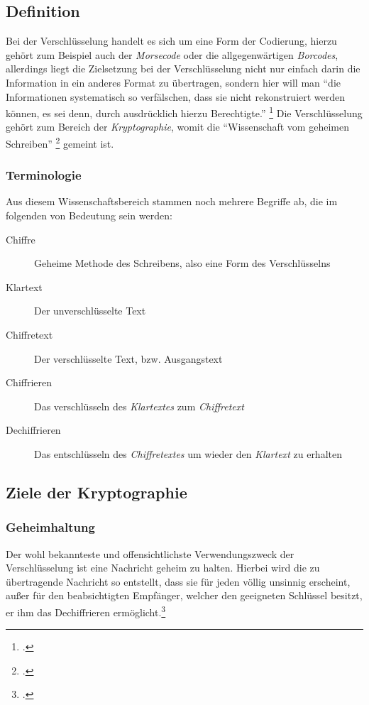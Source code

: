\documentclass{scrarticle}
\begin{document}
    \subsection{Definition}
    Bei der Verschlüsselung handelt es sich um eine Form der Codierung, hierzu gehört zum Beispiel auch der \emph{Morsecode} oder die allgegenwärtigen \emph{Borcodes}, allerdings liegt die Zielsetzung bei der Verschlüsselung nicht nur einfach darin die Information in ein anderes Format zu übertragen, sondern hier will man \enquote{die Informationen systematisch so verfälschen, dass sie nicht rekonstruiert werden können, es sei denn, durch ausdrücklich hierzu Berechtigte.} \footcite[263]{dankmeier2006}
    Die Verschlüsselung gehört zum Bereich der \emph{Kryptographie}, womit die \enquote{Wissenschaft vom geheimen Schreiben} \footcite[1]{watjen2008} gemeint ist.

    \subsubsection{Terminologie}
    Aus diesem Wissenschaftsbereich stammen noch mehrere Begriffe ab, die im folgenden von Bedeutung sein werden:
    \begin{description}
        \item[Chiffre] Geheime Methode des Schreibens, also eine Form des Verschlüsselns
        \item[Klartext] Der unverschlüsselte Text
        \item[Chiffretext] Der verschlüsselte Text, bzw. Ausgangstext
        \item[Chiffrieren] Das verschlüsseln des \emph{Klartextes} zum \emph{Chiffretext}
        \item[Dechiffrieren] Das entschlüsseln des \emph{Chiffretextes} um wieder den \emph{Klartext} zu erhalten
    \end{description}

    \subsection[Ziele]{Ziele der Kryptographie}
    \subsubsection{Geheimhaltung}
    Der wohl bekannteste und offensichtlichste Verwendungszweck der Verschlüsselung ist eine Nachricht geheim zu halten. Hierbei wird die zu übertragende Nachricht so entstellt, dass sie für jeden völlig unsinnig erscheint, außer für den beabsichtigten Empfänger, welcher den geeigneten Schlüssel besitzt, er ihm das Dechiffrieren ermöglicht.\footcite[17]{beutelspacher2015}
\end{document}

